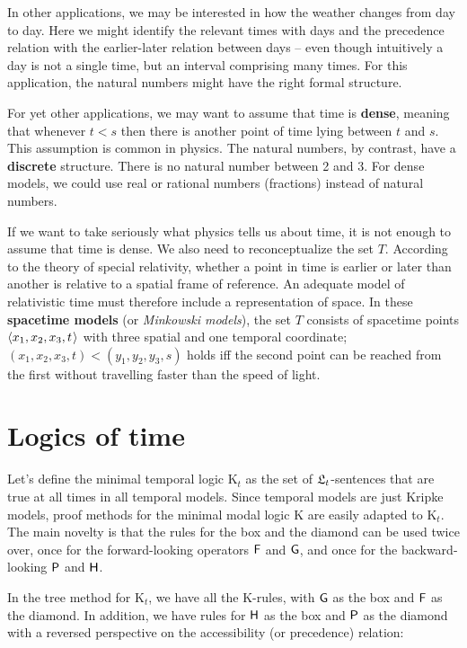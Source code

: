 In other applications, we may be interested in how the weather changes from day
to day. Here we might identify the relevant times with days and the precedence
relation with the earlier-later relation between days -- even though intuitively a day
is not a single time, but an interval comprising many times. For this
application, the natural numbers might have the right formal structure.

For yet other applications, we may want to assume that time is \textbf{dense},
meaning that whenever $t < s$ then there is another point of time lying 
between $t$ and $s$. This assumption is common in physics. The natural numbers,
by contrast, have a \textbf{discrete} structure. There is no natural number
between 2 and 3. For dense models, we could use real or rational numbers
(fractions) instead of natural numbers.


If we want to take seriously what physics tells us about time, it is not enough
to assume that time is dense. We also need to reconceptualize the set $T$.
According to the theory of special relativity, whether a point in time is
earlier or later than another is relative to a spatial frame of reference. An
adequate model of relativistic time must therefore include a representation of
space. In these \textbf{spacetime models} (or \emph{Minkowski models}), the set
$T$ consists of spacetime points $\t{x_1,x_2,x_3,t}$ with three spatial and one
temporal coordinate; $(x_1,x_2,x_3,t) < (y_1,y_2,y_3,s)$ holds iff the second
point can be reached from the first without travelling faster than the speed of
light.

\section{Logics of time}

Let's define the minimal temporal logic K$_t$ as the set of $\mathfrak{L}_{t}$-sentences
that are true at all times in all temporal models. Since temporal models are
just Kripke models, proof methods for the minimal modal logic K are easily
adapted to K$_{t}$. The main novelty is that the rules for the box and the
diamond can be used twice over, once for the forward-looking operators $\operatorname{\mathsf{F}}$ and
$\operatorname{\mathsf{G}}$, and once for the backward-looking $\operatorname{\mathsf{P}}$ and $\operatorname{\mathsf{H}}$.

In the tree method for K$_{t}$, we have all the K-rules, with $\operatorname{\mathsf{G}}$ as the box
and $\operatorname{\mathsf{F}}$ as the diamond. In addition, we have rules for $\operatorname{\mathsf{H}}$ as the box and
$\operatorname{\mathsf{P}}$ as the diamond with a reversed perspective on the accessibility (or
precedence) relation:

